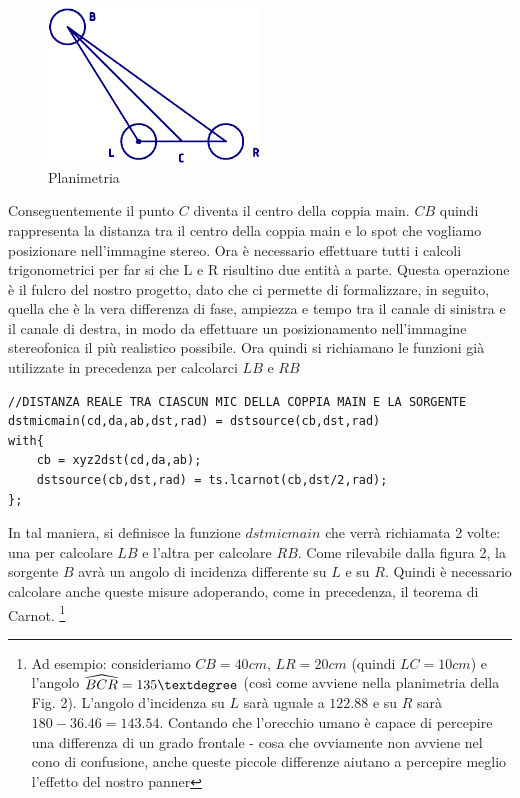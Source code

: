 \documentclass{article}
\begin{document}
    \begin{figure}[H]
        \centering
        \includegraphics[width=0.5\textwidth]{images/PLANIMETRIA.png}
         \caption{\label{fig2}Planimetria}
    \end{figure}

    Conseguentemente il punto $C$ diventa il centro della coppia main. $CB$ quindi rappresenta la distanza tra il centro della coppia main e lo spot che vogliamo posizionare nell'immagine stereo.
    Ora è necessario effettuare tutti i calcoli trigonometrici per far si che L e R risultino due entità a parte. Questa operazione è il fulcro del nostro progetto, dato che ci permette di formalizzare, in seguito, quella che è la vera differenza di fase, ampiezza e tempo tra il canale di sinistra e il canale di destra, in modo da effettuare un posizionamento nell'immagine stereofonica il più realistico possibile.
    Ora quindi si richiamano le funzioni già utilizzate in precedenza per calcolarci $LB$ e $RB$ \\
    
    \begin{lstlisting}
//DISTANZA REALE TRA CIASCUN MIC DELLA COPPIA MAIN E LA SORGENTE
dstmicmain(cd,da,ab,dst,rad) = dstsource(cb,dst,rad)
with{
    cb = xyz2dst(cd,da,ab);
    dstsource(cb,dst,rad) = ts.lcarnot(cb,dst/2,rad);
};
    \end{lstlisting}
    
    In tal maniera, si definisce la funzione $dstmicmain$ che verrà richiamata 2 volte: una per calcolare $LB$ e l'altra per calcolare $RB$.
    Come rilevabile dalla figura 2, la sorgente $B$ avrà un angolo di incidenza differente su $L$ e su $R$. Quindi è necessario calcolare anche queste misure adoperando, come in precedenza, il teorema di Carnot.
    \footnote{Ad esempio: consideriamo $CB = 40 cm$, $LR = 20cm$ (quindi $LC=10cm$) e l'angolo $\widehat{BCR} = 135\textdegree$ (così come avviene nella planimetria della Fig. 2). L'angolo d'incidenza su $L$ sarà uguale a $122.88$ e su $R$ sarà $180-36.46=143.54$. Contando che l'orecchio umano è capace di percepire una differenza di un grado frontale - cosa che ovviamente non avviene nel cono di confusione, anche queste piccole differenze aiutano a percepire meglio l'effetto del nostro panner}
    
\end{document}
